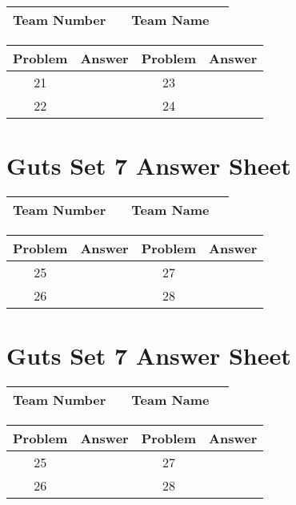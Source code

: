 \documentclass[14pt]{article}
\begin{document}
\begin{center}
\begin{tabular}{|r|r|r|r|}
\hline
	Team Number & \hspace{10em} &
	Team Name & \hspace{15em} \\ \hline
\end{tabular}
\end{center}
\begin{tabularx}{\textwidth}{|c|l|c|X|}\hline
	Problem & Answer & Problem & Answer \\\hline
	21 & \hspace{15em} & 23 & \\\hline
	22 & & 24 & \\\hline
\end{tabularx}

\section*{Guts Set 7 Answer Sheet}

\begin{center}
\begin{tabular}{|r|r|r|r|}
\hline
	Team Number & \hspace{10em} &
	Team Name & \hspace{15em} \\ \hline
\end{tabular}
\end{center}
\begin{tabularx}{\textwidth}{|c|l|c|X|}\hline
	Problem & Answer & Problem & Answer \\\hline
	25 & \hspace{15em} & 27 & \\\hline
	26 & & 28 & \\\hline
\end{tabularx}

\vspace{30px}

\section*{Guts Set 7 Answer Sheet}

\begin{center}
\begin{tabular}{|r|r|r|r|}
\hline
	Team Number & \hspace{10em} &
	Team Name & \hspace{15em} \\ \hline
\end{tabular}
\end{center}
\begin{tabularx}{\textwidth}{|c|l|c|X|}\hline
	Problem & Answer & Problem & Answer \\\hline
	25 & \hspace{15em} & 27 & \\\hline
	26 & & 28 & \\\hline
\end{tabularx}
\end{document}
